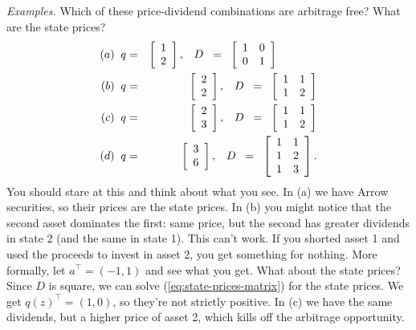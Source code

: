 \documentclass[11pt]{article}
\begin{document}
{\it Examples.\/}
Which of these price-dividend combinations are arbitrage free?
What are the state prices?
\begin{eqnarray*}
  (a) \;\;  q &=& \left[
            \begin{array}{c}
             1 \\ 2
            \end{array}
          \right], \;\;\;
        D \;\;=\;\;
            \left[
            \begin{array}{cc}
             1 & 0 \\ 0 & 1
            \end{array}
          \right]    \hspace*{0.5in}  \\
  (b) \;\;  q &=& \left[
            \begin{array}{c}
             2 \\ 2
            \end{array}
          \right], \;\;\;
        D \;\;=\;\;
            \left[
            \begin{array}{cc}
             1 & 1 \\ 1 & 2
            \end{array}
          \right]      \\
  (c) \;\;    q &=& \left[
            \begin{array}{c}
             2 \\ 3
            \end{array}
          \right], \;\;\;
        D \;\;=\;\;
            \left[
            \begin{array}{cc}
             1 & 1 \\ 1 & 2
            \end{array}
          \right]      \\
  (d) \;\;    q &=& \left[
            \begin{array}{c}
             3 \\ 6
            \end{array}
          \right], \;\;\;
        D \;\;=\;\;
            \left[
            \begin{array}{cc}
             1 & 1 \\ 1 & 2 \\ 1 & 3
            \end{array}
          \right]    .
\end{eqnarray*}
You should stare at this and think about what you see.
In (a) we have Arrow securities,
so their prices are the state prices.
In (b) you might notice that the second asset dominates the first:
same price, but the second has greater dividends in state 2
(and the same in state 1).
This can't work.  If you shorted asset 1 and used the proceeds to invest
in asset 2, you get something for nothing.
More  formally, let $a^\top = (-1,1)$ and see what you get.
What about the state prices?
Since $D$ is square, we can solve (\ref{eq:state-prices-matrix})
for the state prices.
We get $q(z)^\top = (1, 0)$, so they're not strictly positive.
In (c) we have the same dividends, but a higher price of asset 2,
which kills off the arbitrage opportunity.
\end{document}
